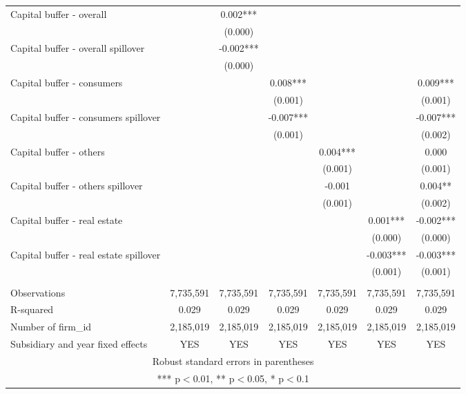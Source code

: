 \begin{tabular}{lcccccc}
Capital buffer - overall &  & 0.002*** &  &  &  &  \\
 &  & (0.000) &  &  &  &  \\
Capital buffer - overall spillover &  & -0.002*** &  &  &  &  \\
 &  & (0.000) &  &  &  &  \\
Capital buffer - consumers &  &  & 0.008*** &  &  & 0.009*** \\
 &  &  & (0.001) &  &  & (0.001) \\
Capital buffer - consumers spillover &  &  & -0.007*** &  &  & -0.007*** \\
 &  &  & (0.001) &  &  & (0.002) \\
Capital buffer - others &  &  &  & 0.004*** &  & 0.000 \\
 &  &  &  & (0.001) &  & (0.001) \\
Capital buffer - others spillover &  &  &  & -0.001 &  & 0.004** \\
 &  &  &  & (0.001) &  & (0.002) \\
Capital buffer - real estate &  &  &  &  & 0.001*** & -0.002*** \\
 &  &  &  &  & (0.000) & (0.000) \\
Capital buffer - real estate spillover &  &  &  &  & -0.003*** & -0.003*** \\
 &  &  &  &  & (0.001) & (0.001) \\
 &  &  &  &  &  &  \\
Observations & 7,735,591 & 7,735,591 & 7,735,591 & 7,735,591 & 7,735,591 & 7,735,591 \\
R-squared & 0.029 & 0.029 & 0.029 & 0.029 & 0.029 & 0.029 \\
Number of firm\_id & 2,185,019 & 2,185,019 & 2,185,019 & 2,185,019 & 2,185,019 & 2,185,019 \\
 Subsidiary and year fixed effects & YES & YES & YES & YES & YES & YES \\ \hline
\multicolumn{7}{c}{ Robust standard errors in parentheses} \\
\multicolumn{7}{c}{ *** p$<$0.01, ** p$<$0.05, * p$<$0.1} \\
\end{tabular}
